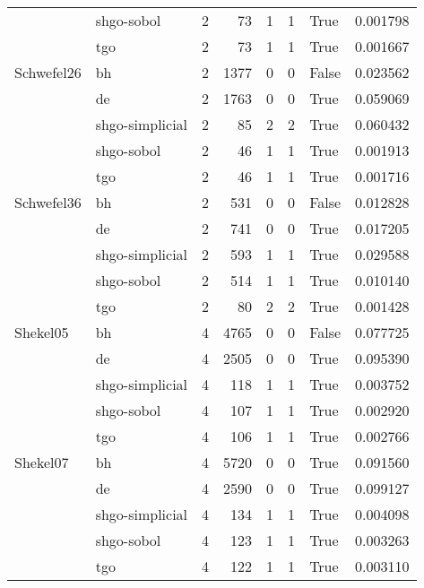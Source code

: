 \begin{longtable}{llrrrrlr}
         & shgo-sobol &     2 &       73 &      1 &       1 &    True &    0.001798 \\
         & tgo &     2 &       73 &      1 &       1 &    True &    0.001667 \\
Schwefel26 & bh &     2 &     1377 &      0 &       0 &   False &    0.023562 \\
         & de &     2 &     1763 &      0 &       0 &    True &    0.059069 \\
         & shgo-simplicial &     2 &       85 &      2 &       2 &    True &    0.060432 \\
         & shgo-sobol &     2 &       46 &      1 &       1 &    True &    0.001913 \\
         & tgo &     2 &       46 &      1 &       1 &    True &    0.001716 \\
Schwefel36 & bh &     2 &      531 &      0 &       0 &   False &    0.012828 \\
         & de &     2 &      741 &      0 &       0 &    True &    0.017205 \\
         & shgo-simplicial &     2 &      593 &      1 &       1 &    True &    0.029588 \\
         & shgo-sobol &     2 &      514 &      1 &       1 &    True &    0.010140 \\
         & tgo &     2 &       80 &      2 &       2 &    True &    0.001428 \\
Shekel05 & bh &     4 &     4765 &      0 &       0 &   False &    0.077725 \\
         & de &     4 &     2505 &      0 &       0 &    True &    0.095390 \\
         & shgo-simplicial &     4 &      118 &      1 &       1 &    True &    0.003752 \\
         & shgo-sobol &     4 &      107 &      1 &       1 &    True &    0.002920 \\
         & tgo &     4 &      106 &      1 &       1 &    True &    0.002766 \\
Shekel07 & bh &     4 &     5720 &      0 &       0 &    True &    0.091560 \\
         & de &     4 &     2590 &      0 &       0 &    True &    0.099127 \\
         & shgo-simplicial &     4 &      134 &      1 &       1 &    True &    0.004098 \\
         & shgo-sobol &     4 &      123 &      1 &       1 &    True &    0.003263 \\
         & tgo &     4 &      122 &      1 &       1 &    True &    0.003110 \\

\end{longtable}
